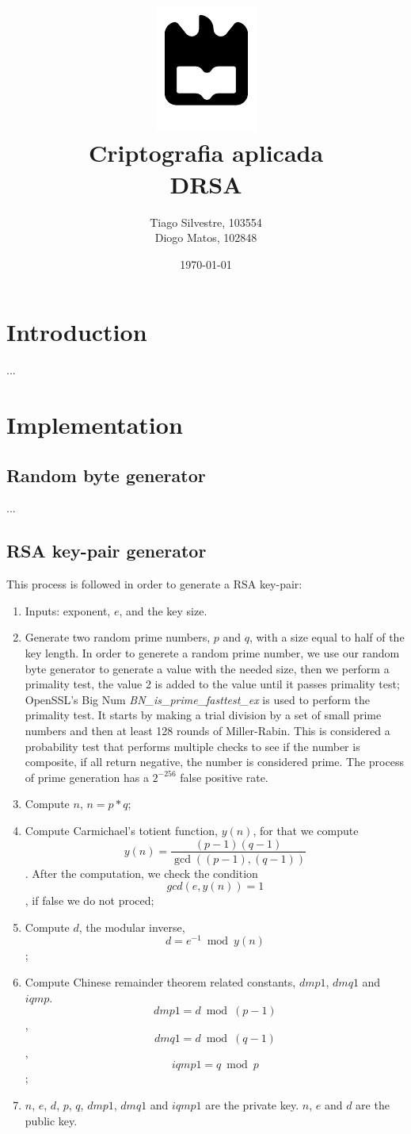 \documentclass{article} %
\title{%
    \includegraphics[width=0.3\linewidth]{./assets/logo.pdf}\\[20pt]
    \Huge \bfseries Criptografia aplicada \\[10pt]
    \Large DRSA
}
\author{Tiago Silvestre, 103554 \\ Diogo Matos, 102848}
\date{\today}
\begin{document}
\maketitle

\newpage

\tableofcontents

\clearpage

\section{Introduction}
...

\section{Implementation}
\subsection{Random byte generator}
...

\subsection{RSA key-pair generator}

This process is followed in order to generate a RSA key-pair:
\begin{enumerate}
  \item Inputs: exponent, $e$, and the key size.
  \item Generate two random prime numbers, $p$ and $q$, with a size equal to half of the key length.
  In order to generete a random prime number, we use our random byte generator to generate
  a value with the needed size, then we perform a primality test, the value 2 is added to the value until it passes primality test;
  OpenSSL's Big Num \textit{BN\_is\_prime\_fasttest\_ex} is used to perform the primality test. It starts by making a trial division by a set of
  small prime numbers and then at least 128 rounds of Miller-Rabin. This is considered a probability
  test that performs multiple checks to see if the number is composite, if all return negative, the number is considered prime. The process of 
  prime generation has a $2^{-256}$ false positive rate.
  \item Compute $n$, $n=p*q$;
  \item Compute Carmichael's totient function, $y(n)$, for that we compute $$y(n)=\frac{(p-1)(q-1)}{\gcd((p-1),(q-1))}$$.
  After the computation, we check the condition $$gcd(e, y(n)) = 1$$, if false we do not proced;
  \item Compute $d$, the modular inverse, $$d=e^{-1} \bmod{y(n)}$$;
  \item Compute Chinese remainder theorem related constants, $dmp1$, $dmq1$ and $iqmp$. 
  $$dmp1=d \bmod{(p-1)}$$, $$dmq1=d \bmod{(q-1)}$$, $$iqmp1=q \bmod{p}$$;
  \item $n$, $e$, $d$, $p$, $q$, $dmp1$, $dmq1$ and $iqmp1$ are the private key. $n$, $e$ and $d$ are the public key.
\end{enumerate}
\end{document}
